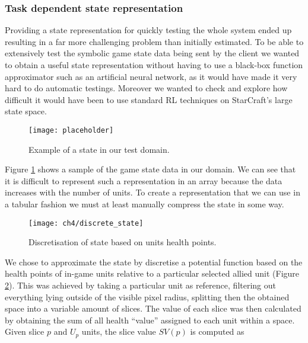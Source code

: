 \subsubsection{Task dependent state representation}

Providing a state representation for quickly testing the whole system ended up
resulting in a far more challenging problem than initially estimated. To be able
to extensively test the symbolic game state data being sent by the client we
wanted to obtain a useful state representation without having to use a black-box
function approximator such as an artificial neural network, as it would have
made it very hard to do automatic testings. Moreover we wanted to check and
explore how difficult it would have been to use standard RL techniques on
StarCraft's large state space.

\begin{figure}[h]
    \centering
    \texttt{[image: placeholder]}
    \caption{Example of a state in our test domain.}
    \label{fig:sample_state}
\end{figure}

Figure \ref{fig:sample_state} shows a sample of the game state data in our
domain. We can see that it is difficult to represent such a representation in an
array because the data increases with the number of units. To create a
representation that we can use in a tabular fashion we must at least manually
compress the state in some way.

\begin{figure}[h]
    \centering
    \texttt{[image: ch4/discrete\_state]}
    \caption{Discretisation of state based on units health points.}
    \label{fig:discrete_state}
\end{figure}

We chose to approximate the state by discretise a potential function
\citep{diebelthrun} based on the health points of in-game units relative to a
particular selected allied unit (Figure \ref{fig:discrete_state}). This was
achieved by taking a particular unit as reference, filtering out everything
lying outside of the visible pixel radius, splitting then the obtained space
into a variable amount of slices. The value of each slice was then calculated by
obtaining the sum of all health ``value'' assigned to each unit within a space.
Given slice $p$ and $U_p$ units, the slice value $SV(p)$ is computed as

